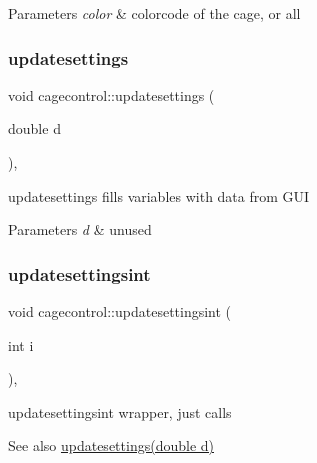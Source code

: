 \begin{DoxyParams}{Parameters}
{\em color} & colorcode of the cage, or \textquotesingle{}all\textquotesingle{} \\
\hline
\end{DoxyParams}
\mbox{\label{classcagecontrol_a244c02598b4b73db82b5852561634084}} 
\subsubsection{\texorpdfstring{updatesettings}{updatesettings}}
{\footnotesize\ttfamily void cagecontrol\+::updatesettings (\begin{DoxyParamCaption}\item[{double}]{d }\end{DoxyParamCaption})\hspace{0.3cm}{\ttfamily [private]}, {\ttfamily [slot]}}



updatesettings fills variables with data from G\+UI 


\begin{DoxyParams}{Parameters}
{\em d} & unused \\
\hline
\end{DoxyParams}
\mbox{\label{classcagecontrol_a2cfb7b65a7b8838d5f2acaa384a7cfcc}} 
\subsubsection{\texorpdfstring{updatesettingsint}{updatesettingsint}}
{\footnotesize\ttfamily void cagecontrol\+::updatesettingsint (\begin{DoxyParamCaption}\item[{int}]{i }\end{DoxyParamCaption})\hspace{0.3cm}{\ttfamily [private]}, {\ttfamily [slot]}}



updatesettingsint wrapper, just calls 

\begin{DoxySeeAlso}{See also}
\hyperlink{classcagecontrol_a244c02598b4b73db82b5852561634084}{updatesettings(double d)} 
\end{DoxySeeAlso}

